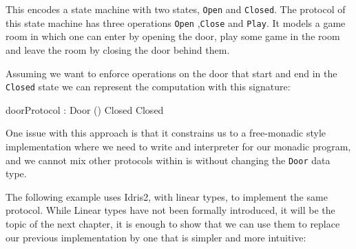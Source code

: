 \documentclass[
]{article}
\newenvironment{Shaded}{}{}
\newcommand{\DataTypeTok}[1]{\textcolor[rgb]{0.56,0.13,0.00}{#1}}
\newcommand{\NormalTok}[1]{#1}
\newcommand{\OperatorTok}[1]{\textcolor[rgb]{0.40,0.40,0.40}{#1}}
\begin{document}
This encodes a state machine with two states, \texttt{Open} and
\texttt{Closed}. The protocol of this state machine has three operations
\texttt{Open} ,\texttt{Close} and \texttt{Play}. It models a game room
in which one can enter by opening the door, play some game in the room
and leave the room by closing the door behind them.

Assuming we want to enforce operations on the door that start and end in
the \texttt{Closed} state we can represent the computation with this
signature:

\begin{Shaded}
\begin{Highlighting}[]
\NormalTok{doorProtocol }\OperatorTok{:} \DataTypeTok{Door}\NormalTok{ () }\DataTypeTok{Closed} \DataTypeTok{Closed}
\end{Highlighting}
\end{Shaded}

One issue with this approach is that it constrains us to a free-monadic
style implementation where we need to write and interpreter for our
monadic program, and we cannot mix other protocols within is without
changing the \texttt{Door} data type.

The following example uses Idris2, with linear types, to implement the
same protocol. While Linear types have not been formally introduced, it
will be the topic of the next chapter, it is enough to show that we can
use them to replace our previous implementation by one that is simpler
and more intuitive:
\end{document}
